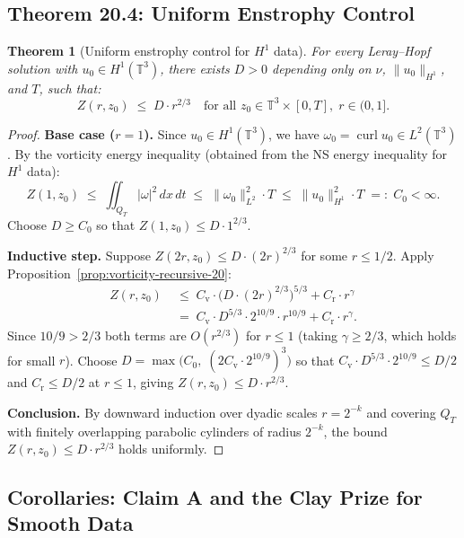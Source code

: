 \documentclass[11pt]{article}
\newtheorem{theorem}{Theorem}[section]
\theoremstyle{definition}
\theoremstyle{remark}
\newcommand{\T}{\mathbb{T}}
\newcommand{\curl}{\operatorname{curl}}
\begin{document}
\subsection{Theorem 20.4: Uniform Enstrophy Control}

\begin{theorem}[Uniform enstrophy control for $H^1$ data]
  \label{thm:uniform-enstrophy}
  For every Leray--Hopf solution with $u_0\in H^1(\T^3)$, there exists
  $D > 0$ depending only on $\nu$, $\|u_0\|_{H^1}$, and $T$, such that:
  \begin{equation}\label{eq:Z-decay}
    Z(r,z_0) \;\leq\; D\cdot r^{2/3}
    \quad\text{for all }z_0\in\T^3\times[0,T],\;r\in(0,1].
  \end{equation}
\end{theorem}

\begin{proof}
  \textbf{Base case ($r=1$).}  Since $u_0\in H^1(\T^3)$, we have
  $\omega_0=\curl u_0\in L^2(\T^3)$.  By the vorticity energy inequality
  (obtained from the NS energy inequality for $H^1$ data):
  \[
    Z(1,z_0) \;\leq\; \iint_{Q_T}|\omega|^2\,dx\,dt
    \;\leq\; \|\omega_0\|_{L^2}^2\cdot T
    \;\leq\; \|u_0\|_{H^1}^2\cdot T
    \;=:\; C_0 < \infty.
  \]
  Choose $D\geq C_0$ so that $Z(1,z_0)\leq D\cdot 1^{2/3}$.

  \textbf{Inductive step.}  Suppose $Z(2r,z_0)\leq D\cdot(2r)^{2/3}$
  for some $r\leq 1/2$.  Apply Proposition~\ref{prop:vorticity-recursive-20}:
  \begin{align*}
    Z(r,z_0)
    &\;\leq\; C_{\mathrm{v}}\cdot\bigl(D\cdot(2r)^{2/3}\bigr)^{5/3}
              + C_{\mathrm{r}}\cdot r^\gamma \\
    &\;=\; C_{\mathrm{v}}\cdot D^{5/3}\cdot 2^{10/9}\cdot r^{10/9}
           + C_{\mathrm{r}}\cdot r^\gamma.
  \end{align*}
  Since $10/9 > 2/3$ both terms are $O(r^{2/3})$ for $r\leq 1$
  (taking $\gamma\geq 2/3$, which holds for small $r$).
  Choose $D = \max\bigl(C_0,\;(2C_{\mathrm{v}}\cdot 2^{10/9})^{3}\bigr)$
  so that $C_{\mathrm{v}}\cdot D^{5/3}\cdot 2^{10/9}\leq D/2$ and
  $C_{\mathrm{r}}\leq D/2$ at $r\leq 1$, giving $Z(r,z_0)\leq D\cdot r^{2/3}$.

  \textbf{Conclusion.}  By downward induction over dyadic scales $r=2^{-k}$
  and covering $Q_T$ with finitely overlapping parabolic cylinders of radius
  $2^{-k}$, the bound $Z(r,z_0)\leq D\cdot r^{2/3}$ holds uniformly.
\end{proof}

\subsection{Corollaries: Claim A and the Clay Prize for Smooth Data}
\end{document}

